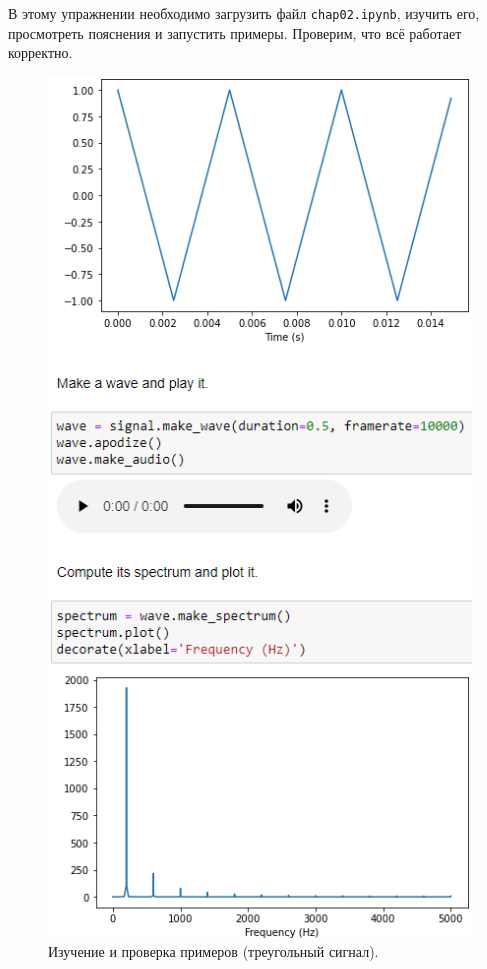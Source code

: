\documentclass[a4paper, 14pt]{extarticle}
\begin{document}
    В этому упражнении необходимо загрузить файл \texttt{chap02.ipynb}, изучить его, просмотреть пояснения и запустить примеры.
    Проверим, что всё работает корректно.

    \begin{figure}[H]
        \centering
        \includegraphics[width=0.55\linewidth]{resources/Images/task1_check_triangle}
        \caption{Изучение и проверка примеров (треугольный сигнал).}
        \label{fig:task1_check_triangle}
    \end{figure}
\end{document}
